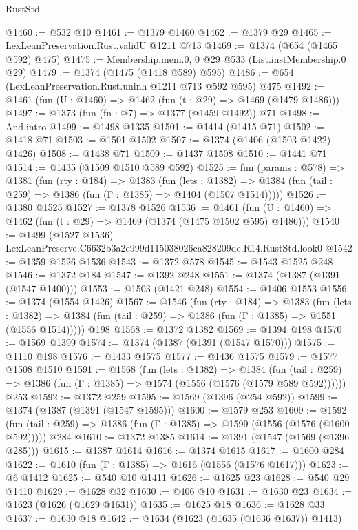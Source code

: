 \begin{lexlean}{RustStd}
\begin{coremodule}
@1460 := @532 @10
@1461 := @1379 @1460
@1462 := @1379 @29
@1465 := LexLeanPreservation.Rust.validU @1211 @713
@1469 := @1374 (@654 (@1465 @592) @475)
@1475 := Membership.mem.{0, 0} @29 @533 (List.instMembership.{0} @29)
@1479 := @1374 (@1475 (@1418 @589) @595)
@1486 := @654 (LexLeanPreservation.Rust.uninh @1211 @713 @592 @595) @475
@1492 := @1461 (fun (U : @1460) => @1462 (fun (t : @29) => @1469 (@1479 @1486)))
@1497 := @1373 (fun (fn : @7) => @1377 (@1459 @1492)) @71
@1498 := And.intro
@1499 := @1498 @1335
@1501 := @1414 (@1415 @71)
@1502 := @1418 @71
@1503 := @1501 @1502
@1507 := @1374 (@1406 (@1503 @1422) @1426)
@1508 := @1438 @71
@1509 := @1437 @1508
@1510 := @1441 @71
@1514 := @1435 (@1509 @1510 @589 @592)
@1525 := fun (params : @578) =>
  @1381
    (fun (rty : @184) =>
    @1383
      (fun (lets : @1382) =>
      @1384 (fun (tail : @259) => @1386 (fun (Γ : @1385) => @1404 (@1507 @1514)))))
@1526 := @1380 @1525
@1527 := @1378 @1526
@1536 := @1461 (fun (U : @1460) => @1462 (fun (t : @29) => @1469 (@1374 (@1475 @1502 @595) @1486)))
@1540 := @1499 (@1527 @1536) LexLeanPreserve.C6632b3a2e999d115038026ca828209de.R14.RustStd.look0
@1542 := @1359 @1526 @1536
@1543 := @1372 @578
@1545 := @1543 @1525 @248
@1546 := @1372 @184
@1547 := @1392 @248
@1551 := @1374 (@1387 (@1391 (@1547 @1400)))
@1553 := @1503 (@1421 @248)
@1554 := @1406 @1553
@1556 := @1374 (@1554 @1426)
@1567 := @1546
    (fun (rty : @184) =>
    @1383
      (fun (lets : @1382) =>
      @1384 (fun (tail : @259) => @1386 (fun (Γ : @1385) => @1551 (@1556 @1514)))))
    @198
@1568 := @1372 @1382
@1569 := @1394 @198
@1570 := @1569 @1399
@1574 := @1374 (@1387 (@1391 (@1547 @1570)))
@1575 := @1110 @198
@1576 := @1433 @1575
@1577 := @1436 @1575
@1579 := @1577 @1508 @1510
@1591 := @1568
    (fun (lets : @1382) =>
    @1384 (fun (tail : @259) => @1386 (fun (Γ : @1385) => @1574 (@1556 (@1576 (@1579 @589 @592))))))
    @253
@1592 := @1372 @259
@1595 := @1569 (@1396 (@254 @592))
@1599 := @1374 (@1387 (@1391 (@1547 @1595)))
@1600 := @1579 @253
@1609 := @1592
    (fun (tail : @259) => @1386 (fun (Γ : @1385) => @1599 (@1556 (@1576 (@1600 @592)))))
    @284
@1610 := @1372 @1385
@1614 := @1391 (@1547 (@1569 (@1396 @285)))
@1615 := @1387 @1614
@1616 := @1374 @1615
@1617 := @1600 @284
@1622 := @1610 (fun (Γ : @1385) => @1616 (@1556 (@1576 @1617)))
@1623 := @6 @1412
@1625 := @540 @10 @1411
@1626 := @1625 @23
@1628 := @540 @29 @1410
@1629 := @1628 @32
@1630 := @406 @10
@1631 := @1630 @23
@1634 := @1623 (@1626 (@1629 @1631))
@1635 := @1625 @18
@1636 := @1628 @33
@1637 := @1630 @18
@1642 := @1634 (@1623 (@1635 (@1636 @1637)) @1413)

\end{coremodule}
\end{lexlean}

